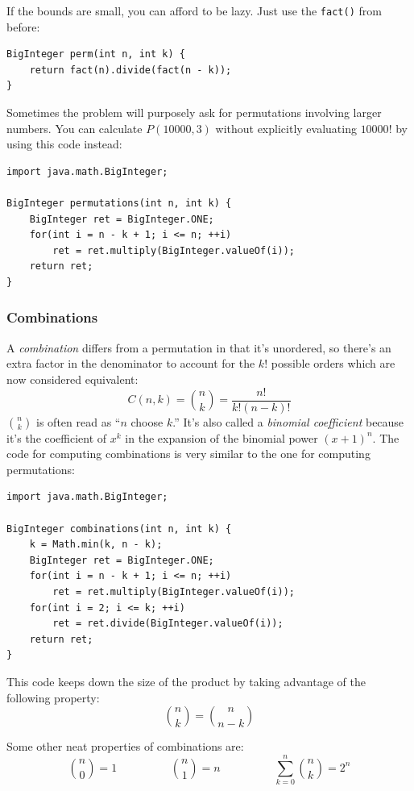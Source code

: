 \documentclass[a4paper,12pt]{article}
\begin{document}
If the bounds are small, you can afford to be lazy. Just use the \verb/fact()/ from before:
\begin{lstlisting}
BigInteger perm(int n, int k) {
	return fact(n).divide(fact(n - k));
}
\end{lstlisting}

\noindent Sometimes the problem will purposely ask for permutations involving larger numbers. You can calculate $P(10000,3)$ without explicitly evaluating $10000!$ by using this code instead:
\begin{lstlisting}
import java.math.BigInteger;

BigInteger permutations(int n, int k) {
	BigInteger ret = BigInteger.ONE;
	for(int i = n - k + 1; i <= n; ++i)
		ret = ret.multiply(BigInteger.valueOf(i));
	return ret;
}
\end{lstlisting}

\subsubsection{Combinations}
A {\em combination} differs from a permutation in that it's unordered, so there's an extra factor in the denominator to account for the $k!$ possible orders which are now considered equivalent:
\[C(n,k) = {n \choose k} = \frac{n!}{k!(n-k)!}\]
\noindent ${n \choose k}$ is often read as ``$n$ choose $k$.'' It's also called a {\em binomial coefficient} because it's the coefficient of $x^k$ in the expansion of the binomial power $\left(x+1\right)^n$. The code for computing combinations is very similar to the one for computing permutations:

\begin{lstlisting}
import java.math.BigInteger;

BigInteger combinations(int n, int k) {
	k = Math.min(k, n - k);
	BigInteger ret = BigInteger.ONE;
	for(int i = n - k + 1; i <= n; ++i)
		ret = ret.multiply(BigInteger.valueOf(i));
	for(int i = 2; i <= k; ++i)
		ret = ret.divide(BigInteger.valueOf(i));
	return ret;
}
\end{lstlisting}

This code keeps down the size of the product by taking advantage of the following property:
\[{n \choose k}={n \choose {n-k}}\]

Some other neat properties of combinations are:
\[{n \choose 0}=1 \hspace{2cm} {n \choose 1}=n \hspace{2cm} \sum_{k=0}^{n}{n \choose k}=2^n\]
\end{document}
